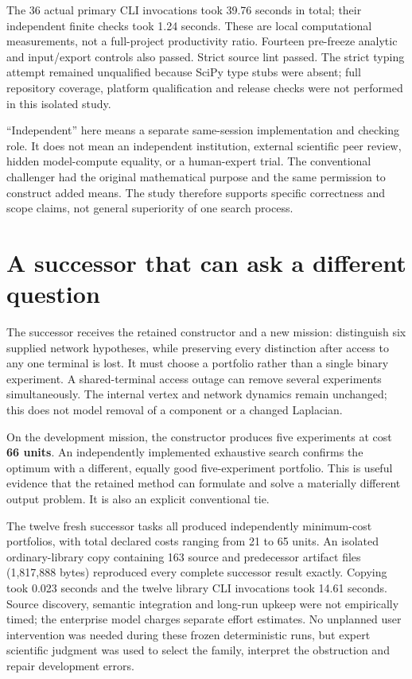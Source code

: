 \documentclass[
  11pt,
]{article}
\begin{document}
The 36 actual primary CLI invocations took 39.76 seconds in total; their
independent finite checks took 1.24 seconds. These are local
computational measurements, not a full-project productivity ratio.
Fourteen pre-freeze analytic and input/export controls also passed.
Strict source lint passed. The strict typing attempt remained
unqualified because SciPy type stubs were absent; full repository
coverage, platform qualification and release checks were not performed
in this isolated study.

``Independent'' here means a separate same-session implementation and
checking role. It does not mean an independent institution, external
scientific peer review, hidden model-compute equality, or a human-expert
trial. The conventional challenger had the original mathematical purpose
and the same permission to construct added means. The study therefore
supports specific correctness and scope claims, not general superiority
of one search process.

\hypertarget{a-successor-that-can-ask-a-different-question}{%
\section{A successor that can ask a different
question}\label{a-successor-that-can-ask-a-different-question}}

The successor receives the retained constructor and a new mission:
distinguish six supplied network hypotheses, while preserving every
distinction after access to any one terminal is lost. It must choose a
portfolio rather than a single binary experiment. A shared-terminal
access outage can remove several experiments simultaneously. The
internal vertex and network dynamics remain unchanged; this does not
model removal of a component or a changed Laplacian.

On the development mission, the constructor produces five experiments at
cost \textbf{66 units}. An independently implemented exhaustive search
confirms the optimum with a different, equally good five-experiment
portfolio. This is useful evidence that the retained method can
formulate and solve a materially different output problem. It is also an
explicit conventional tie.

The twelve fresh successor tasks all produced independently minimum-cost
portfolios, with total declared costs ranging from 21 to 65 units. An
isolated ordinary-library copy containing 163 source and predecessor
artifact files (1,817,888 bytes) reproduced every complete successor
result exactly. Copying took 0.023 seconds and the twelve library CLI
invocations took 14.61 seconds. Source discovery, semantic integration
and long-run upkeep were not empirically timed; the enterprise model
charges separate effort estimates. No unplanned user intervention was
needed during these frozen deterministic runs, but expert scientific
judgment was used to select the family, interpret the obstruction and
repair development errors.
\end{document}
